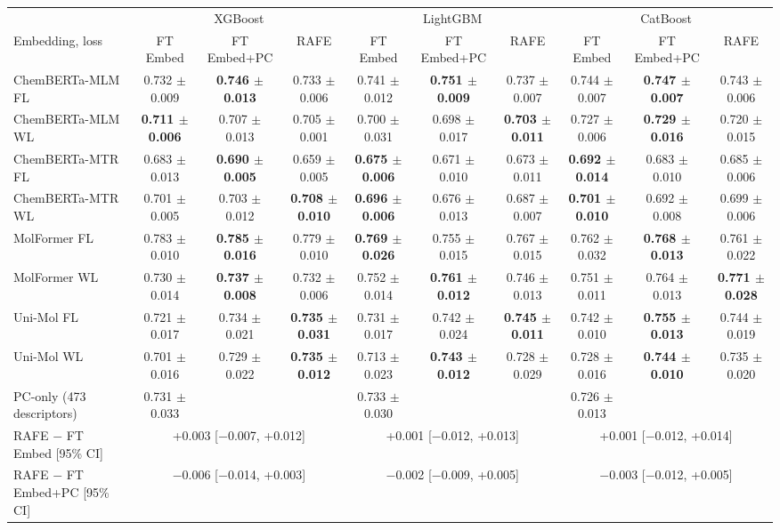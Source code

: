 \begin{tabular}{@{}lccccccccc@{}}
\toprule
 & \multicolumn{3}{c}{XGBoost} & \multicolumn{3}{c}{LightGBM} & \multicolumn{3}{c}{CatBoost} \\
\cmidrule(lr){2-4} \cmidrule(lr){5-7} \cmidrule(lr){8-10}
Embedding, loss & FT Embed & FT Embed+PC & RAFE & FT Embed & FT Embed+PC & RAFE & FT Embed & FT Embed+PC & RAFE \\
\midrule
ChemBERTa-MLM FL & 0.732 $\pm$ 0.009 & \textbf{0.746 $\pm$ 0.013} & 0.733 $\pm$ 0.006 & 0.741 $\pm$ 0.012 & \textbf{0.751 $\pm$ 0.009} & 0.737 $\pm$ 0.007 & 0.744 $\pm$ 0.007 & \textbf{0.747 $\pm$ 0.007} & 0.743 $\pm$ 0.006 \\
ChemBERTa-MLM WL & \textbf{0.711 $\pm$ 0.006} & 0.707 $\pm$ 0.013 & 0.705 $\pm$ 0.001 & 0.700 $\pm$ 0.031 & 0.698 $\pm$ 0.017 & \textbf{0.703 $\pm$ 0.011} & 0.727 $\pm$ 0.006 & \textbf{0.729 $\pm$ 0.016} & 0.720 $\pm$ 0.015 \\
ChemBERTa-MTR FL & 0.683 $\pm$ 0.013 & \textbf{0.690 $\pm$ 0.005} & 0.659 $\pm$ 0.005 & \textbf{0.675 $\pm$ 0.006} & 0.671 $\pm$ 0.010 & 0.673 $\pm$ 0.011 & \textbf{0.692 $\pm$ 0.014} & 0.683 $\pm$ 0.010 & 0.685 $\pm$ 0.006 \\
ChemBERTa-MTR WL & 0.701 $\pm$ 0.005 & 0.703 $\pm$ 0.012 & \textbf{0.708 $\pm$ 0.010} & \textbf{0.696 $\pm$ 0.006} & 0.676 $\pm$ 0.013 & 0.687 $\pm$ 0.007 & \textbf{0.701 $\pm$ 0.010} & 0.692 $\pm$ 0.008 & 0.699 $\pm$ 0.006 \\
MolFormer FL & 0.783 $\pm$ 0.010 & \textbf{0.785 $\pm$ 0.016} & 0.779 $\pm$ 0.010 & \textbf{0.769 $\pm$ 0.026} & 0.755 $\pm$ 0.015 & 0.767 $\pm$ 0.015 & 0.762 $\pm$ 0.032 & \textbf{0.768 $\pm$ 0.013} & 0.761 $\pm$ 0.022 \\
MolFormer WL & 0.730 $\pm$ 0.014 & \textbf{0.737 $\pm$ 0.008} & 0.732 $\pm$ 0.006 & 0.752 $\pm$ 0.014 & \textbf{0.761 $\pm$ 0.012} & 0.746 $\pm$ 0.013 & 0.751 $\pm$ 0.011 & 0.764 $\pm$ 0.013 & \textbf{0.771 $\pm$ 0.028} \\
Uni-Mol FL & 0.721 $\pm$ 0.017 & 0.734 $\pm$ 0.021 & \textbf{0.735 $\pm$ 0.031} & 0.731 $\pm$ 0.017 & 0.742 $\pm$ 0.024 & \textbf{0.745 $\pm$ 0.011} & 0.742 $\pm$ 0.010 & \textbf{0.755 $\pm$ 0.013} & 0.744 $\pm$ 0.019 \\
Uni-Mol WL & 0.701 $\pm$ 0.016 & 0.729 $\pm$ 0.022 & \textbf{0.735 $\pm$ 0.012} & 0.713 $\pm$ 0.023 & \textbf{0.743 $\pm$ 0.012} & 0.728 $\pm$ 0.029 & 0.728 $\pm$ 0.016 & \textbf{0.744 $\pm$ 0.010} & 0.735 $\pm$ 0.020 \\
\midrule
PC-only (473 descriptors) & 0.731 $\pm$ 0.033 &  &  & 0.733 $\pm$ 0.030 &  &  & 0.726 $\pm$ 0.013 &  &  \\
RAFE $-$ FT Embed [95\% CI] & \multicolumn{3}{c}{+0.003 [$-$0.007, +0.012]} & \multicolumn{3}{c}{+0.001 [$-$0.012, +0.013]} & \multicolumn{3}{c}{+0.001 [$-$0.012, +0.014]} \\
RAFE $-$ FT Embed+PC [95\% CI] & \multicolumn{3}{c}{$-$0.006 [$-$0.014, +0.003]} & \multicolumn{3}{c}{$-$0.002 [$-$0.009, +0.005]} & \multicolumn{3}{c}{$-$0.003 [$-$0.012, +0.005]} \\
\bottomrule
\end{tabular}

